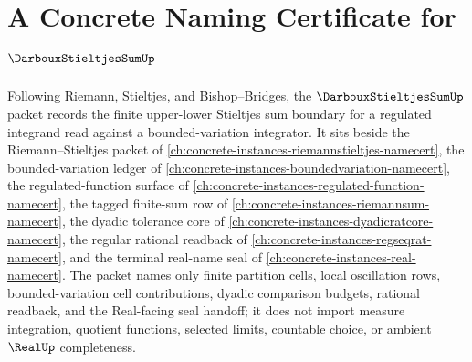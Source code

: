 \chapter{A Concrete Naming Certificate for $\DarbouxStieltjesSumUp$}
\label{ch:concrete-instances-darboux-stieltjes-sum-namecert}

Following Riemann, Stieltjes, and Bishop--Bridges, the $\DarbouxStieltjesSumUp$ packet records the finite upper-lower Stieltjes sum boundary for a regulated integrand read against a bounded-variation integrator. It sits beside the Riemann--Stieltjes packet of \autoref{ch:concrete-instances-riemannstieltjes-namecert}, the bounded-variation ledger of \autoref{ch:concrete-instances-boundedvariation-namecert}, the regulated-function surface of \autoref{ch:concrete-instances-regulated-function-namecert}, the tagged finite-sum row of \autoref{ch:concrete-instances-riemannsum-namecert}, the dyadic tolerance core of \autoref{ch:concrete-instances-dyadicratcore-namecert}, the regular rational readback of \autoref{ch:concrete-instances-regseqrat-namecert}, and the terminal real-name seal of \autoref{ch:concrete-instances-real-namecert}. The packet names only finite partition cells, local oscillation rows, bounded-variation cell contributions, dyadic comparison budgets, rational readback, and the Real-facing seal handoff; it does not import measure integration, quotient functions, selected limits, countable choice, or ambient $\RealUp$ completeness.

